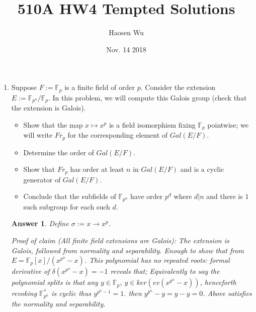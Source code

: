 \documentclass[11pt,leqno]{article}
\newcommand{\F}{{\mathbb F}}
\newcommand{\<}[1]{{\langle}#1 {\rangle}}
\newcommand{\F}{{\mathcal F}}
\theoremstyle{plain}
\newtheorem*{answer*}{Answer}
\theoremstyle{definition}
\theoremstyle{remark}
\numberwithin{equation}{section}
\begin{document}
\pagestyle{fancy}
\renewcommand{\sectionmark}[1]{\markright{\thesection\ #1}}
\fancyhead{}
\fancyhead[LO,R]{\bfseries\footnotesize\thepage}
\fancyhead[LE]{\bfseries\footnotesize\rightmark}
\fancyhead[RO]{\bfseries\footnotesize\rightmark}
\chead[]{}
\cfoot[]{}
\setlength{\headheight}{1cm}

\author{Haosen Wu}
\title{{\bf 510A HW4 Tempted Solutions}}
\date{Nov. 14 2018}

\maketitle
\begin{enumerate}

\item Suppose $F := {\mathbb F}_p$ is a finite field of order $p$.  Consider the extension $E := {\mathbb F}_{p^n}/{\mathbb F}_p$.  In this problem, we will compute this Galois group (check that the extension is Galois).
    \begin{itemize}
    \item Show that the map $x \mapsto x^p$ is a field isomorphism fixing ${\mathbb F}_p$ pointwise; we will write $Fr_p$ for the corresponding element of $Gal(E/F)$.
    \item Determine the order of $Gal(E/F)$.
    \item Show that $Fr_p$ has order at least $n$ in $Gal(E/F)$ and is a cyclic generator of $Gal(E/F)$.
    \item Conclude that the subfields of ${\mathbb F}_{p^n}$ have order $p^d$ where $d | n$ and there is $1$ such subgroup for each such $d$.
    \end{itemize}
    
    \begin{answer*}
    \smallskip
    Define $\sigma:= x \rightarrow x^p$.
    
    Proof of claim (All finite field extensions are Galois): The extension is Galois, followed from normality and separability. Enough to show that from  $E=\F_p[x]/(x^{p^n}-x)$. This polynomial has no repeated roots: formal derivative of $\delta(x^{p^n}-x)=-1$ reveals that; Equivalently to say the polynomial splits is that any $y\in \F_p$, $y\in ker(ev(x^{p^n}-x))$, henceforth revoking $\F_{p^n}^*$ is cyclic thus $y^{p^n-1}=1$. then $y^{p^n}-y=y-y=0$. Above satisfies the  normality and separability.
    
        \begin{itemize} 
        

\end{itemize}
\end{answer*}
\end{enumerate}
\end{document}
